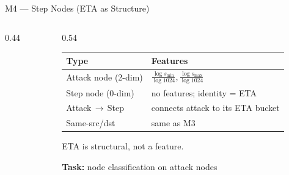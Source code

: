 \documentclass[10pt]{beamer}
\begin{document}
\begin{frame}{M4 — Step Nodes (ETA as Structure)}
\begin{columns}[T]

\begin{column}{0.44\textwidth}
\centering
{}
\end{column}

\begin{column}{0.54\textwidth}
\footnotesize
\begin{tabular}{@{}p{1.9cm}p{3.3cm}@{}}
  \toprule
  Type & Features \\
  \midrule
  Attack node \newline (2-dim) &
    $\tfrac{\log s_{\min}}{\log 1024}$,\,$\tfrac{\log s_{\max}}{\log 1024}$ \\[4pt]
  Step node \newline (0-dim) & no features; identity = ETA \\[4pt]
  Attack\,$\to$\,Step & connects attack to its ETA bucket \\[4pt]
  Same-src/dst & same as M3 \\
  \bottomrule
\end{tabular}

\vspace{6pt}
ETA is structural, not a feature.

\vspace{6pt}
\textbf{Task:} node classification on attack nodes
\end{column}

\end{columns}
\end{frame}
\end{document}

